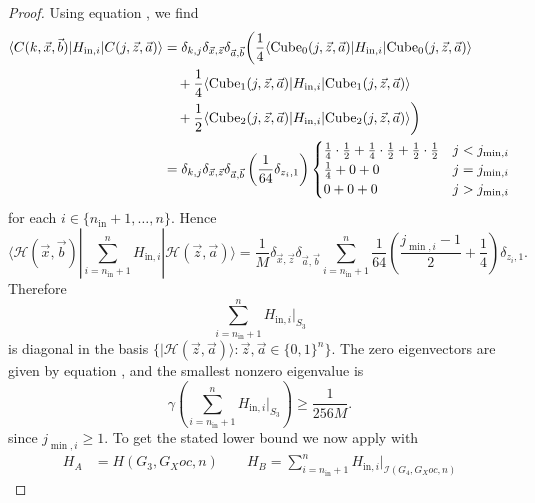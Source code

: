 \documentclass[../thesis-main/thesis-main]{subfiles}
\begin{document}
\begin{proof}
Using equation , we find
\begin{align}
\langle C(k,\vec{x},\vec{b})|H_{\text{in},i}|C(j,\vec{z},\vec{a})\rangle
&=\delta_{k,j} \delta_{\vec{x},\vec{z}}\delta_{\vec{a},\vec{b}}\bigg(\frac{1}{4}\langle {\operatorname{Cube}_0(j,\vec{z},\vec{a})}|H_{\text{in},i}|{\operatorname{Cube}_0(j,\vec{z},\vec{a})}\rangle\\
&\quad+\frac{1}{4}\langle {\operatorname{Cube}_1(j,\vec{z},\vec{a})}|H_{\text{in},i}| {\operatorname{Cube}_1(j,\vec{z},\vec{a})}\rangle \\
&\quad+\frac{1}{2}\langle {\operatorname{Cube}_2(j,\vec{z},\vec{a})}|H_{\text{in},i}| {\operatorname{Cube}_2(j,\vec{z},\vec{a})}\rangle\bigg)\\
&=\delta_{k,j} \delta_{\vec{x},\vec{z}}\delta_{\vec{a},\vec{b}}\left(\frac{1}{64}\delta_{z_i,1}\right)\begin{cases}
\frac{1}{4}\cdot\frac{1}{2}+\frac{1}{4}\cdot\frac{1}{2}+\frac{1}{2}\cdot\frac{1}{2} & j<j_{\min,i}\\
\frac{1}{4}+0+0 & j=j_{\min,i}\\
0+0+0 & j>j_{\min,i}
\end{cases}
\end{align}
for each $i\in\{n_{\text{in}}+1,\ldots,n\}$. Hence 
\begin{equation}
\langle\mathcal{H}(\vec{x},\vec{b})|\sum_{i=n_{\text{in}}+1}^{n}H_{\text{in},i}|\mathcal{H}(\vec{z},\vec{a})\rangle=\frac{1}{M}\delta_{\vec{x},\vec{z}}\delta_{\vec{a},\vec{b}}\sum_{i=n_{\text{in}}+1}^{n}\frac{1}{64}\left(\frac{j_{\min,i}-1}{2}+\frac{1}{4}\right)\delta_{z_{i},1}.
\end{equation}
Therefore
\begin{equation}
\sum_{i=n_{\text{in}}+1}^{n}H_{\text{in},i}\big|_{S_{3}}
\end{equation}
is diagonal in the basis $\{|\mathcal{H}(\vec{z},\vec{a})\rangle\colon\vec{z},\vec{a}\in\{0,1\}^{n}\}$. The zero eigenvectors are given by equation , and the smallest nonzero eigenvalue is
\begin{equation}
\gamma\left(\sum_{i=n_{\text{in}}+1}^{n}H_{\text{in},i}\big|_{S_{3}}\right)\geq\frac{1}{256M}.\label{eq:lbnd_Hinj}
\end{equation}
since $j_{\min,i}\geq1$. To get the stated lower bound we now apply  with 
\begin{align}
H_{A} & =H(G_{3},G_Xoc,n)\qquad H_{B}=\sum_{i=n_{\text{in}}+1}^{n}H_{\text{in},i}\big|_{\mathcal{I}(G_{4},G_Xoc,n)}
\end{align}

\end{proof}
\end{document}
